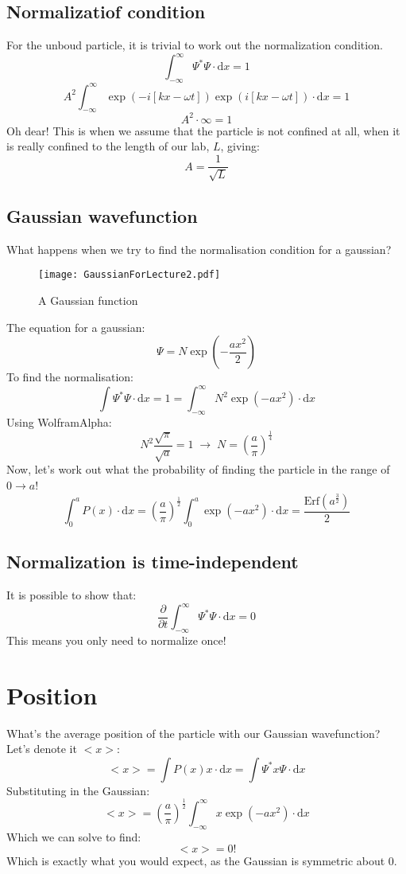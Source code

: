 \subsection{Normalizatiof condition}

For the unboud particle, it is trivial to work out the normalization condition.
$$	
	\int^\infty_{-\infty} \Psi^* \Psi \cdot \mathrm{d}x = 1
$$
$$
	A^2\int^\infty_{-\infty} \exp(-i[kx-\omega t])\exp(i[kx-\omega t]) 
	\cdot \mathrm{d}x = 1
$$
$$
	A^2 \cdot \infty = 1
$$
Oh dear! This is when we assume that the particle is not confined at all, when
it is really confined to the length of our lab, $L$, giving:
$$
	A = \frac{1}{\sqrt{L}}
$$

\subsection{Gaussian wavefunction}

What happens when we try to find the normalisation condition for a gaussian?
\begin{figure}[h!]
	\centering
	\texttt{[image: GaussianForLecture2.pdf]}
	\caption{A Gaussian function}
\end{figure}
The equation for a gaussian:
$$
	\Psi = N\exp\left(-\frac{ax^2}{2}\right)
$$
To find the normalisation:
$$
	\int\Psi^* \Psi \cdot \mathrm{d}x = 1 = 
	\int^\infty_{-\infty}N^2 \exp\left(-{ax^2}\right)\cdot \mathrm{d}x
$$
Using WolframAlpha:
$$
	N^2\frac{\sqrt{\pi}}{\sqrt{a}} = 1 \; \rightarrow \;
	N = {\left(\frac{a}{\pi}\right)}^{\frac{1}{4}}
$$
Now, let's work out what the probability of finding the particle in the range of
$0 \rightarrow a$!
$$
	\int_0^a P(x)\cdot \mathrm{d}x = 
	{\left(\frac{a}{\pi}\right)}^{\frac{1}{2}}
	\int^a_0 \exp(-ax^2)\cdot\mathrm{d}x =
	\frac{\mathrm{Erf}\left(a^\frac{3}{2}\right)}{2}
$$

\subsection{Normalization is time-independent}
It is possible to show that:
$$
	\frac{\partial}{\partial t} \int^\infty_{-\infty}\Psi^* \Psi\cdot\mathrm{d}x
	= 0
$$
This means you only need to normalize once!

\section{Position}
What's the average position of the particle with our Gaussian wavefunction?
Let's denote it $<x>$:
$$
	<x> = \int P(x) x \cdot \mathrm{d}x = \int\Psi^* x \Psi \cdot \mathrm{d}x
$$
Substituting in the Gaussian:
$$
	<x> = {\left(\frac{a}{\pi}\right)}^{\frac{1}{2}}
	\int^\infty_{-\infty} x \exp(-ax^2) \cdot \mathrm{d}x
$$
Which we can solve to find:
$$
	<x> = 0!
$$
Which is exactly what you would expect, as the Gaussian is symmetric about 0.

